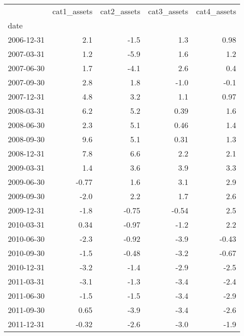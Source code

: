 \begin{tabular}{lrrrr}
\toprule
{} &  cat1\_assets &  cat2\_assets &  cat3\_assets &  cat4\_assets \\
date       &              &              &              &              \\
\midrule
2006-12-31 &          2.1 &         -1.5 &          1.3 &         0.98 \\
2007-03-31 &          1.2 &         -5.9 &          1.6 &          1.2 \\
2007-06-30 &          1.7 &         -4.1 &          2.6 &          0.4 \\
2007-09-30 &          2.8 &          1.8 &         -1.0 &         -0.1 \\
2007-12-31 &          4.8 &          3.2 &          1.1 &         0.97 \\
2008-03-31 &          6.2 &          5.2 &         0.39 &          1.6 \\
2008-06-30 &          2.3 &          5.1 &         0.46 &          1.4 \\
2008-09-30 &          9.6 &          5.1 &         0.31 &          1.3 \\
2008-12-31 &          7.8 &          6.6 &          2.2 &          2.1 \\
2009-03-31 &          1.4 &          3.6 &          3.9 &          3.3 \\
2009-06-30 &        -0.77 &          1.6 &          3.1 &          2.9 \\
2009-09-30 &         -2.0 &          2.2 &          1.7 &          2.6 \\
2009-12-31 &         -1.8 &        -0.75 &        -0.54 &          2.5 \\
2010-03-31 &         0.34 &        -0.97 &         -1.2 &          2.2 \\
2010-06-30 &         -2.3 &        -0.92 &         -3.9 &        -0.43 \\
2010-09-30 &         -1.5 &        -0.48 &         -3.2 &        -0.67 \\
2010-12-31 &         -3.2 &         -1.4 &         -2.9 &         -2.5 \\
2011-03-31 &         -3.1 &         -1.3 &         -3.4 &         -2.4 \\
2011-06-30 &         -1.5 &         -1.5 &         -3.4 &         -2.9 \\
2011-09-30 &         0.65 &         -3.9 &         -3.4 &         -2.6 \\
2011-12-31 &        -0.32 &         -2.6 &         -3.0 &         -1.9 \\
\bottomrule
\end{tabular}
